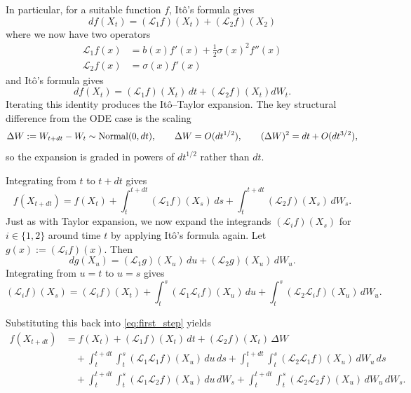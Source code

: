\documentclass[11pt]{article}
\begin{document}
In particular, for a suitable function $f$, 
 It\^{o}'s formula gives
\begin{equation}
df(X_t)
=
(\mathcal L_1 f)(X_t)
+
(\mathcal L_2 f) (X_2)
\end{equation}
where we now have two operators
\begin{align}
\mathcal L_1 f(x)
&=
b(x) f'(x)
+
\frac12 \sigma(x)^2 f''(x)\\
\mathcal L_2 f(x) &= \sigma(x)f'(x)
\end{align}
and It\^{o}'s formula gives
\begin{equation}
df(X_t)
=
(\mathcal L_1 f)(X_t)\,dt
+
(\mathcal L_2 f)(X_t)dW_t.
\end{equation}
Iterating this identity produces the It\^{o}--Taylor expansion.  The key structural difference from the ODE case is the scaling
\begin{equation}
\Delta W := W_{t+dt}-W_t \sim {\rm Normal}(0,dt),
\qquad
\Delta W = O(dt^{1/2}),
\qquad
(\Delta W)^2 = dt + O(dt^{3/2}),
\end{equation}
so the expansion is graded in powers of $dt^{1/2}$ rather than $dt$.


Integrating from $t$ to $t+dt$ gives
\begin{equation}\label{eq:first_step}
f(X_{t+dt})
=
f(X_t)
+
\int_t^{t+dt} (\mathcal L_1 f)(X_s)\,ds
+
\int_t^{t+dt} (\mathcal L_2 f)(X_s)\,dW_s.
\end{equation}
Just as with Taylor expansion, we now expand the integrands 
$(\mathcal L_i f)(X_s)$ for $i\in\{1,2\}$ around time $t$ by applying It\^{o}'s formula again.  
Let $g(x) := (\mathcal L_i f)(x)$. Then
\begin{equation}
d g(X_u)
=
(\mathcal L_1 g)(X_u)\,du
+
(\mathcal L_2 g)(X_u)\,dW_u.
\end{equation}
Integrating from $u=t$ to $u=s$ gives
\begin{equation}
(\mathcal L_i f)(X_s)
=
(\mathcal L_i f)(X_t)
+
\int_t^s (\mathcal L_1 \mathcal L_i f)(X_u)\,du
+
\int_t^s (\mathcal L_2 \mathcal L_i f)(X_u)\,dW_u.
\end{equation}

Substituting this back into \eqref{eq:first_step} yields
\begin{align}
f(X_{t+dt})
&=
f(X_t)
+
(\mathcal L_1 f)(X_t)\,dt
+
(\mathcal L_2 f)(X_t)\,\Delta W \nonumber \\
&\quad
+
\int_t^{t+dt}
\int_t^{s}
(\mathcal L_1 \mathcal L_1 f)(X_u)\,du\,ds
+
\int_t^{t+dt}
\int_t^{s}
(\mathcal L_2 \mathcal L_1 f)(X_u)\,dW_u\,ds \nonumber \\
&\quad
+
\int_t^{t+dt}
\int_t^{s}
(\mathcal L_1 \mathcal L_2 f)(X_u)\,du\,dW_s
+
\int_t^{t+dt}
\int_t^{s}
(\mathcal L_2 \mathcal L_2 f)(X_u)\,dW_u\,dW_s.
\end{align}
\end{document}
